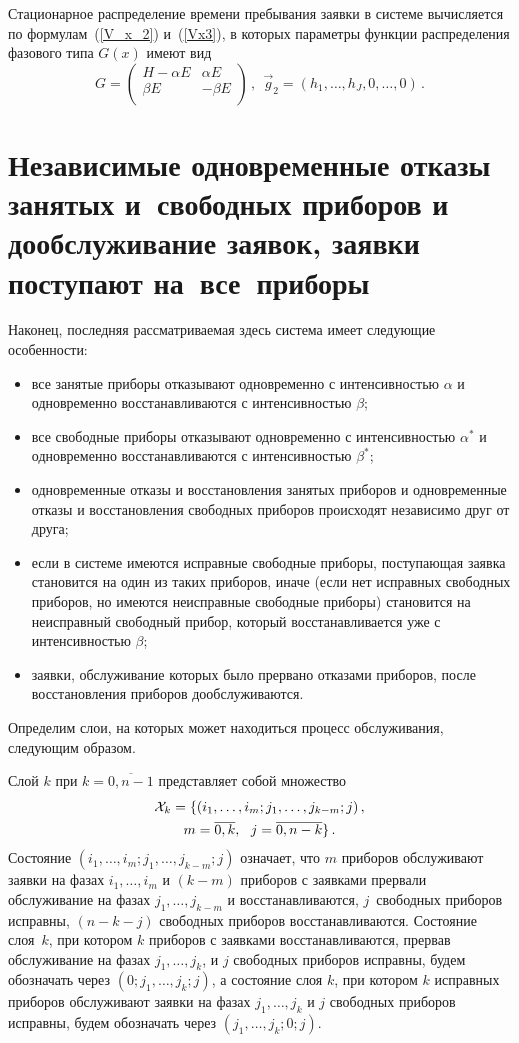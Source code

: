 \begin{multicols}{2}
Стационарное распределение времени пребывания заявки в системе
вычисляется по формулам~(\ref{V_x_2}) и~(\ref{Vx3}), в которых
параметры функции распределения фазового типа $G(x)$ имеют вид
$$
G=
\begin{pmatrix}
H-\alpha E     &    \alpha E   \\
\beta E        &    -\beta E   \\
\end{pmatrix}\,,\ \
\vec{g}_2 =
(h_1,\ldots,h_J,0,\ldots,0)\,.
$$

\section{Независимые одновременные отказы занятых и~свободных
приборов и дообслуживание заявок, заявки поступают на~все~приборы}    %

Наконец, последняя рассматриваемая здесь сис\-те\-ма имеет следующие
особенности:
\begin{itemize}
\item
все занятые приборы отказывают одновременно с интенсивностью $\alpha$
и одновременно восстанавливаются с интенсивностью $\beta$;
\item
все свободные приборы отказывают одновременно с интенсивностью
$\alpha^*$ и одновременно восстанавливаются с интенсивностью $\beta^*$;
\item
 одновременные отказы и восстановления занятых приборов и
одновременные отказы и восстановления свободных приборов
происходят независимо друг от друга;
\item
если в системе имеются исправные свободные приборы, поступающая заявка
становится на один из таких приборов, иначе (если нет исправных свободных
приборов, но имеются неисправные свободные приборы)
становится на неисправный свободный прибор, который восстанавливается
уже с интенсивностью $\beta$;
\item
заявки, обслуживание которых было прервано отказами приборов,
после восстановления приборов дообслуживаются.
\end{itemize}

Определим слои, на которых может находиться процесс обслуживания,
следующим образом.

Слой $k$ при $k=\overline{0,n-1}$ представляет собой множество
\begin{multline*}
{\cal X}_k
=
\{(i_1,\ldots,i_m;j_1,\ldots,j_{k-m};j)\,,\\
m=\overline{0,k},\ \ j=\overline{0,n-k}\}\,.
\end{multline*}
Состояние $(i_1,\ldots,i_m;j_1,\ldots,j_{k-m};j)$ означает,
что $m$ приборов обслуживают заявки на фазах $i_1,\ldots, i_m$
и $(k-m)$ приборов с заявками прервали обслуживание на фазах
$j_1,\ldots,j_{k-m}$ и восстанавливаются, $j$~свободных приборов
исправны, $(n-k-j)$ свободных приборов восстанавливаются.
Состояние слоя~$k$, при котором $k$ приборов с заявками
восстанавливаются, прервав обслуживание на фазах $j_1,\ldots,j_{k}$,
и $j$ свободных приборов исправны, будем обозначать через
$(0;j_1,\ldots,j_k;j)$,
а состояние слоя $k$, при котором $k$ исправных приборов обслуживают
заявки на фазах $j_1,\ldots,j_{k}$ и $j$ свободных приборов исправны,
будем обозначать через $(j_1,\ldots,j_k;0;j)$.


\end{multicols}
